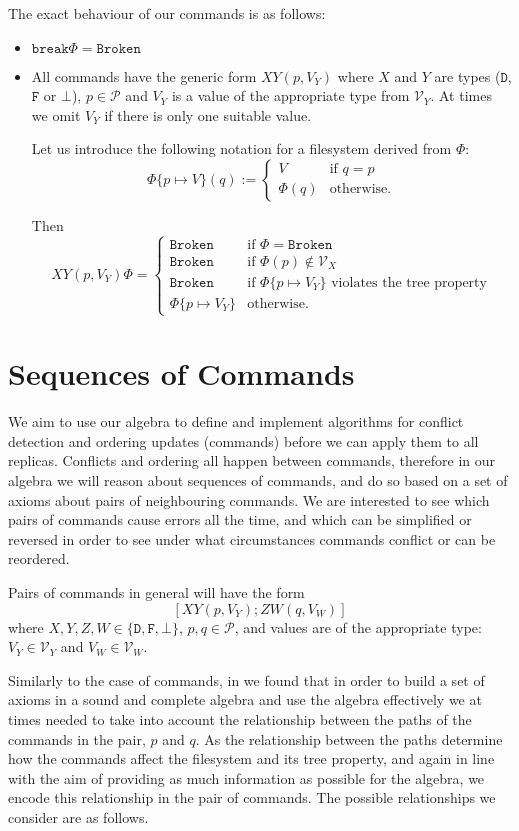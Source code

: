 \documentclass[12pt]{article}
\newcommand{\setvx}[1]{\mathcal{V}_{#1}}
\newcommand{\setp}{\mathcal{P}}
\newcommand{\empt}{\bot}
\newcommand{\fsbroken}{\mathtt{Broken}}
\newcommand{\FS}{\Phi} %
\newcommand{\cbrk}{\mathtt{break}}
\newcommand{\fscommand}[2]{{#1#2}}
\newcommand{\fsregcommandchar}[1]{\mathtt{#1}}
\newcommand{\cxy}{\fscommand{X}{Y}}
\newcommand{\czw}{\fscommand{Z}{W}}
\theoremstyle{definition}
\begin{document}
The exact behaviour of our commands is as follows:
\begin{itemize}
\item $\cbrk\FS = \fsbroken$
\item
All commands have the generic form $\cxy(p,V_Y)$ where
$X$ and $Y$ are types ($\fsregcommandchar{D}$, $\fsregcommandchar{F}$ or $\fsregcommandchar{\empt}$),
$p\in\setp$ and $V_Y$ is a value of the appropriate type from $\setvx{Y}$.
At times we omit $V_Y$ if there is only one suitable value.

Let us introduce the following notation for a filesystem derived from $\FS$:
\[ \FS\{p\mapsto V\}(q) :=
   \begin{cases}
   V &\mbox{if~} q=p\\
   \FS(q) &\mbox{otherwise.}
   \end{cases}
\]

Then
\[ \cxy(p,V_Y)\FS = 
   \begin{cases}
   \fsbroken &\mbox{if~} \FS=\fsbroken\\
   \fsbroken &\mbox{if~} \FS(p)\not\in\setvx{X}\\
   \fsbroken &\mbox{if~} \FS\{p\mapsto V_Y\} \mbox{~violates the tree property}\\
   \FS\{p\mapsto V_Y\} &\mbox{otherwise.}
   \end{cases}
\]
\end{itemize}

\section{Sequences of Commands}

We aim to use our algebra to define and implement algorithms for conflict detection
and ordering updates (commands) before we can apply them to all replicas.
Conflicts and ordering all happen between commands, therefore in our algebra
we will reason about sequences of commands, 
and do so based on a set of axioms about pairs of neighbouring commands.
We are interested to see which pairs of commands cause errors all the time,
and which can be simplified or reversed
in order to see under what circumstances commands conflict or can be reordered.

Pairs of commands in general will have the form
\[ [\cxy(p,V_Y); \czw(q,V_W)] \]
where $X,Y,Z,W\in\{\fsregcommandchar{D},\fsregcommandchar{F},\empt\}$, $p,q\in\setp$, 
and values are of the appropriate type: 
$V_Y\in\setvx{Y}$ and $V_W\in\setvx{W}$.

Similarly to the case of commands, in \cite{NREC:alg} we found that in order to build
a set of axioms in a sound and complete algebra and use the algebra effectively we at times needed to take into account
the relationship between the paths of the commands in the pair, $p$ and $q$.
As the relationship between the paths determine how the commands affect the filesystem
and its tree property, 
and again in line with the aim of providing as much information as possible for the algebra,
we encode this relationship in the pair of commands. The possible relationships we
consider are as follows.
\end{document}
